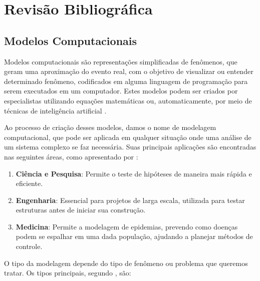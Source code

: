 \documentclass[
    12pt,               %
    openright,          %
    oneside,            %
    a4paper,            %
    english,            %
    brazil              %
    ]{abntex2}
\begin{document}

\chapter{Revisão Bibliográfica}

\section{Modelos Computacionais}

Modelos computacionais são representações simplificadas de fenômenos, que geram uma aproximação
do evento real, com o objetivo de visualizar ou entender determinado fenômeno, codificados em 
alguma linguagem de programação para serem executados em um computador. Estes modelos podem ser criados
por especialistas utilizando equações matemáticas ou, automaticamente, por meio de técnicas de
inteligência artificial \cite{modelos_computacionais}.

Ao processo de criação desses modelos, damos o nome de modelagem computacional, que pode ser aplicada em
qualquer situação onde uma análise de um sistema complexo se faz necessária. Suas principais
aplicações são encontradas nas seguintes áreas, como apresentado por \cite{modelagem_computacional}:

\begin{enumerate}
    \item \textbf{Ciência e Pesquisa}: Permite o teste de hipóteses de maneira mais rápida e eficiente.
    \item \textbf{Engenharia}: Essencial para projetos de larga escala, utilizada para testar estruturas antes de
    iniciar sua construção.
    \item \textbf{Medicina}: Permite a modelagem de epidemias, prevendo como doenças podem se espalhar em uma dada
    população, ajudando a planejar métodos de controle.
\end{enumerate}

O tipo da modelagem depende do tipo de fenômeno ou problema que queremos tratar. Os tipos principais,
segundo \cite{modelagem_computacional}, são:
\end{document}
